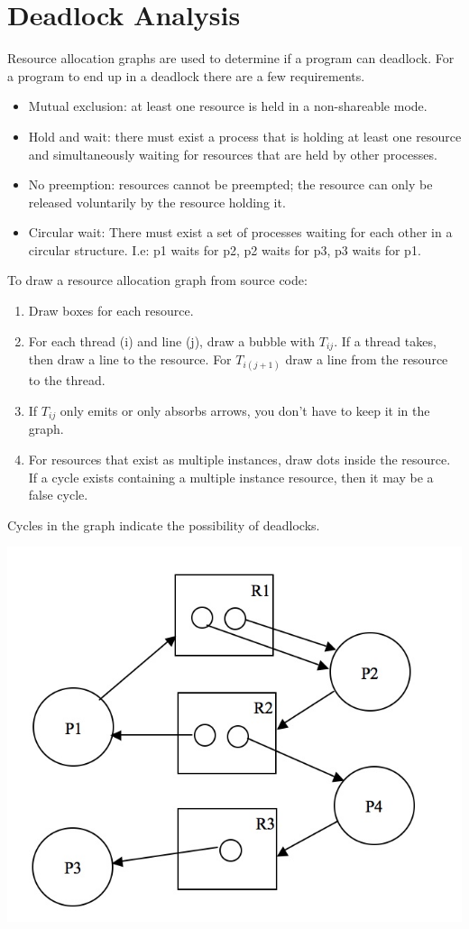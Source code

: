 \documentclass[a4paper]{article}
\begin{document}
\section{Deadlock Analysis}
Resource allocation graphs are used to determine if a program can deadlock.
For a program to end up in a deadlock there are a few requirements.
\begin{itemize}
  \item Mutual exclusion: at least one resource is held in a non-shareable mode.
  \item Hold and wait: there must exist a process that is holding at least one
        resource and simultaneously waiting for resources that are held by other
        processes.
  \item No preemption: resources cannot be preempted; the resource can only be 
        released voluntarily by the resource holding it.
  \item Circular wait: There must exist a set of processes waiting for each other
        in a circular structure. I.e: p1 waits for p2, p2 waits for p3, p3 waits
        for p1.
\end{itemize}

To draw a resource allocation graph from source code:
\begin{enumerate}
  \item Draw boxes for each resource.
  \item For each thread (i) and line (j), draw a bubble with $T_{ij}$. If a thread
        takes, then draw a line to the resource. For $T_{i(j+1)}$ draw a line from the
        resource to the thread.
  \item If $T_{ij}$ only emits or only absorbs arrows, you don't have to keep
        it in the graph.
  \item For resources that exist as multiple instances, draw dots inside the resource.
        If a cycle exists containing a multiple instance resource, then it may be a
        false cycle.
\end{enumerate}

Cycles in the graph indicate the possibility of deadlocks.
\begin{center}
  \includegraphics[scale=0.2]{res_alloc}
\end{center}
\end{document}
